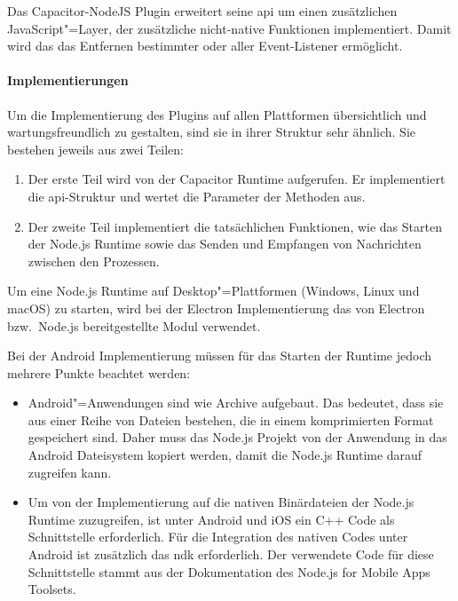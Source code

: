 Das Capacitor-NodeJS Plugin erweitert seine \ac{api} um einen zusätzlichen JavaScript"=Layer, der zusätzliche nicht-native Funktionen implementiert.
Damit wird das das Entfernen bestimmter oder aller Event-Listener ermöglicht.

\paragraph{Implementierungen}

Um die Implementierung des Plugins auf allen Plattformen übersichtlich und wartungsfreundlich zu gestalten, sind sie in ihrer Struktur sehr ähnlich.
Sie bestehen jeweils aus zwei Teilen:

\begin{enumerate}
  \item 
  Der erste Teil wird von der Capacitor Runtime aufgerufen.
  Er implementiert die \acs{api}-Struktur und wertet die Parameter der Methoden aus.
  \item 
  Der zweite Teil implementiert die tatsächlichen Funktionen,
  wie das Starten der Node.js Runtime sowie das Senden und Empfangen von Nachrichten zwischen den Prozessen.
\end{enumerate}

Um eine Node.js Runtime auf Desktop"=Plattformen (Windows, Linux und macOS) zu starten, wird bei der Electron Implementierung das von Electron bzw.\ Node.js bereitgestellte Modul  verwendet.
\cite{electron:docs}

Bei der Android Implementierung müssen für das Starten der Runtime jedoch mehrere Punkte beachtet werden:

\begin{itemize}
  \item
  Android"=Anwendungen sind wie Archive aufgebaut.
  Das bedeutet, dass sie aus einer Reihe von Dateien bestehen, die in einem komprimierten Format gespeichert sind.
  Daher muss das Node.js Projekt von der Anwendung in das Android Dateisystem kopiert werden, damit die Node.js Runtime darauf zugreifen kann.
  \cite{nodejs-mobile:docs}

  \item 
  Um von der Implementierung auf die nativen Binärdateien der Node.js Runtime zuzugreifen, ist unter Android und iOS ein C++ Code als Schnittstelle erforderlich.
  Für die Integration des nativen Codes unter Android ist zusätzlich das \ac{ndk} erforderlich.
  Der verwendete Code für diese Schnittstelle stammt aus der Dokumentation des Node.js for Mobile Apps Toolsets.
  \cite{nodejs-mobile:docs}
\end{itemize}


